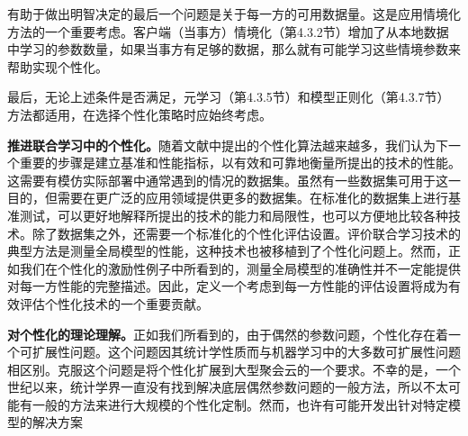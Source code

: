 有助于做出明智决定的最后一个问题是关于每一方的可用数据量。这是应用情境化方法的一个重要考虑。客户端（当事方）情境化（第4.3.2节）增加了从本地数据中学习的参数数量，如果当事方有足够的数据，那么就有可能学习这些情境参数来帮助实现个性化。

最后，无论上述条件是否满足，元学习（第4.3.5节）和模型正则化（第4.3.7节）方法都适用，在选择个性化策略时应始终考虑。

\textbf{推进联合学习中的个性化。}随着文献中提出的个性化算法越来越多，我们认为下一个重要的步骤是建立基准和性能指标，以有效和可靠地衡量所提出的技术的性能。这需要有模仿实际部署中通常遇到的情况的数据集。虽然有一些数据集可用于这一目的，但需要在更广泛的应用领域提供更多的数据集。在标准化的数据集上进行基准测试，可以更好地解释所提出的技术的能力和局限性，也可以方便地比较各种技术。除了数据集之外，还需要一个标准化的个性化评估设置。评价联合学习技术的典型方法是测量全局模型的性能，这种技术也被移植到了个性化问题上。然而，正如我们在个性化的激励性例子中所看到的，测量全局模型的准确性并不一定能提供对每一方性能的完整描述。因此，定义一个考虑到每一方性能的评估设置将成为有效评估个性化技术的一个重要贡献。

\textbf{对个性化的理论理解。}正如我们所看到的，由于偶然的参数问题，个性化存在着一个可扩展性问题。这个问题因其统计学性质而与机器学习中的大多数可扩展性问题相区别。克服这个问题是将个性化扩展到大型聚会云的一个要求。不幸的是，一个世纪以来，统计学界一直没有找到解决底层偶然参数问题的一般方法，所以不太可能有一般的方法来进行大规模的个性化定制。然而，也许有可能开发出针对特定模型的解决方案


